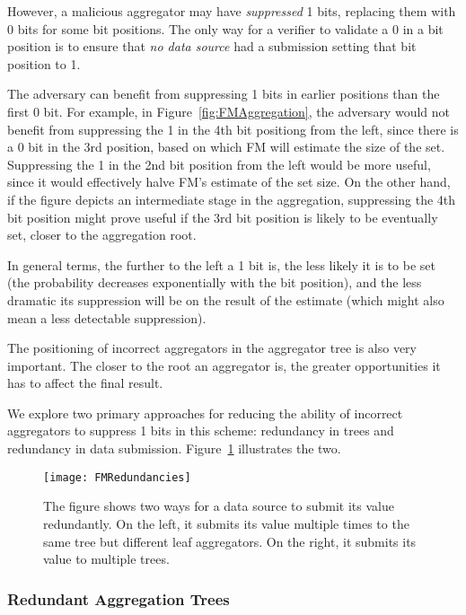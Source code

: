 \documentclass[11pt,twocolumn]{MyTightStyle}
\theoremstyle{plain}
\theoremstyle{definition}
\theoremstyle{remark}
\numberwithin{equation}{section}
\begin{document}
However, a malicious aggregator may
have \emph{suppressed} 1 bits, replacing them with 0 bits for some bit
positions.  The only way for a verifier to validate a 0 in a bit
position is to ensure that \emph{no data source} had a submission
setting that bit position to 1.

The adversary can benefit from suppressing 1 bits in earlier positions
than the first 0 bit.  For example, in Figure~\ref{fig:FMAggregation},
the adversary would not benefit from suppressing the 1 in the 4th bit
positiong from the left, since there is a 0 bit in the 3rd position,
based on which FM will estimate the size of the set.  Suppressing the
1 in the 2nd bit position from the left would be more useful, since it
would effectively halve FM's estimate of the set size.  On the other
hand, if the figure depicts an intermediate stage in the aggregation,
suppressing the 4th bit position might prove useful if the 3rd bit
position is likely to be eventually set, closer to the aggregation root.

In general terms, the further to the left a 1 bit is, the less likely it
is to be set (the probability decreases exponentially with the bit
position), and the less dramatic its suppression will be on the result
of the estimate (which might also mean a less detectable suppression).

The positioning of incorrect aggregators in the aggregator tree is also
very important.  The closer to the root an aggregator is, the greater
opportunities it has to affect the final result.

We explore two primary approaches for reducing the ability of incorrect
aggregators to suppress 1 bits in this scheme: redundancy in trees and
redundancy in data submission.  Figure~\ref{fig:FMRedundancies}
illustrates the two.

\begin{figure}
\begin{center}
\texttt{[image: FMRedundancies]}
\caption{\label{fig:FMRedundancies} The figure shows two ways for a data
  source to submit its value redundantly.  On the left, it submits its
  value multiple times to the same tree but different leaf aggregators.
  On the right, it submits its value to multiple trees.}
\end{center}
\end{figure}


\subsubsection{Redundant Aggregation Trees}
\end{document}
